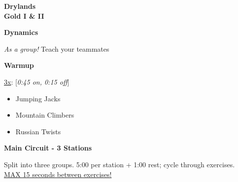\documentclass[11pt]{article}
\begin{document}
\pagestyle{empty}

\noindent
\begin{minipage}[t]{0.75\textwidth}
\vspace{0pt}
{\Huge\bfseries Drylands}\\[0.1cm]
{\LARGE\textcolor{goldtext}{\bfseries Gold I \& II}}
\end{minipage}%
\hfill
{}

\vspace{0.5cm}

\noindent
\colorbox{sectiongray}{\parbox{\textwidth}{\textbf{Dynamics}}}
\vspace{0.001cm}

\textit{As a group!} Teach your teammates

\vspace{.3cm}

\noindent
\colorbox{sectiongray}{\parbox{\textwidth}{\textbf{Warmup}}}
\vspace{0.001cm}

\underline{3x}:
\vspace{0.3cm}
[\textit{0:45 on, 0:15 off}]
\begin{itemize}
    \item Jumping Jacks
    \item Mountain Climbers
    \item Russian Twists
\end{itemize}

\vspace{0.5cm}

\noindent
\colorbox{sectiongray}{\parbox{\textwidth}{\textbf{Main Circuit - 3 Stations}}}

Split into three groups. 5:00 per station + 1:00 rest; cycle through exercises. \underline{MAX 15 seconds between exercises!}

\vspace{0.3cm}
\end{document}
